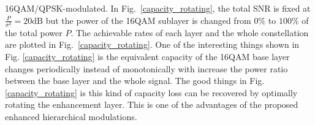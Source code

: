 \documentclass[10pt,fleqn, twocolumn]{IEEEtran}
\begin{document}
16QAM/QPSK-modulated. In Fig.~\ref{capacity_rotating}, the total
SNR is fixed at $\frac{P}{\sigma^2}=20\mbox{dB}$ but the power of
the 16QAM sublayer is changed from $0\%$ to $100\%$ of the total
power $P$. The achievable rates of each layer and the whole
constellation are plotted in Fig.~\ref{capacity_rotating}. One of
the interesting things shown in Fig. \ref{capacity_rotating} is
the equivalent capacity of the 16QAM base layer changes
periodically instead of monotonically with increase the power
ratio between the base layer and the whole signal. The good things
in Fig. \ref{capacity_rotating} is this kind of capacity loss can
be recovered by optimally rotating the enhancement layer. This is
one of the advantages of the proposed enhanced hierarchical
modulations.
\begin{figure}
\end{figure}
\end{document}
